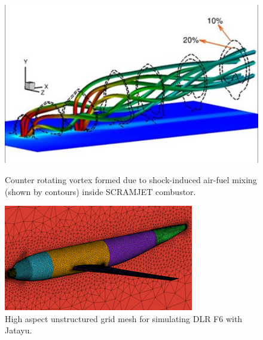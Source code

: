 \documentclass[11pt,sans]{wlscirep} %
\begin{document}
\begin{figure}
  \vspace{-15pt}
    \includegraphics[trim={0.2cm 0.5cm 0.5cm 0.5cm},clip,scale=0.55]{figures/crv_scramjet.png}
  \caption{Counter rotating vortex formed due to shock-induced air-fuel mixing (shown by contours) inside SCRAMJET combustor\cite{sharma2020effect}.} %
  \label{fig:scramjet2}
     \includegraphics[trim={0cm 0cm 0cm 0cm},clip,scale=0.8]{figures/Unstructmesh.png}
 \caption{High aspect unstructured grid mesh for simulating DLR F6 with Jatayu\cite{sharma2022development}.}\vspace{-11pt}
\label{fig:unstrutcmesh}
 \vspace{-2pt}
\end{figure}
\end{document}
